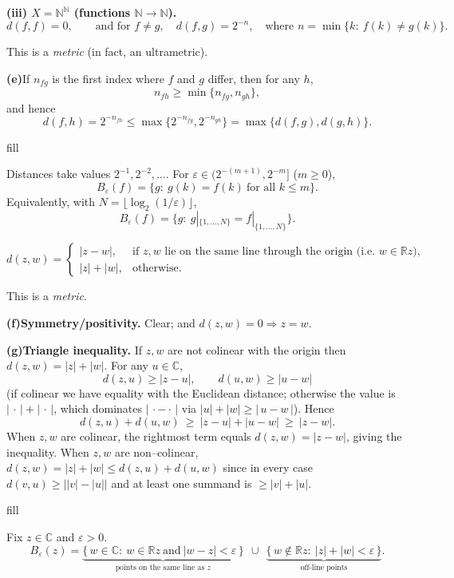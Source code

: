 \begin{problem}[CP-II-0561]
\par\medskip\noindent\textbf{(iii) $X=\mathbb{N}^{\mathbb{N}}$ (functions $\mathbb{N}\to\mathbb{N}$).}\quad
\[
d(f,f)=0,\qquad
\text{and for } f\neq g,\quad d(f,g)=2^{-n},
\quad \text{where } n=\min\{k:\ f(k)\neq g(k)\}.
\]

This is a \emph{metric} (in fact, an ultrametric).

	\par\smallskip\noindent\textbf{(e)}\quad If $n_{fg}$ is the first index where $f$ and $g$ differ, then for any $h$,
	\[
	n_{fh}\ge \min\{n_{fg},n_{gh}\},
	\]
	and hence
	\[
	d(f,h)=2^{-n_{fh}}\le \max\{2^{-n_{fg}},2^{-n_{gh}}\}
	=\max\{d(f,g),d(g,h)\}.
	\]

\noindent
fill

Distances take values $2^{-1},2^{-2},\dots$.
For $\varepsilon\in(2^{-(m+1)},2^{-m}]$ ($m\ge0$),
\[
B_\varepsilon(f)=\{g:\ g(k)=f(k)\ \text{for all } k\le m\}.
\]
Equivalently, with $N=\lfloor\log_2(1/\varepsilon)\rfloor$,
\[
B_\varepsilon(f)=\{g:\ g|_{\{1,\dots,N\}}=f|_{\{1,\dots,N\}}\}.
\]

\[
d(z,w)=
\begin{cases}
	|z-w|, & \text{if $z,w$ lie on the same line through the origin (i.e.\ } w\in \mathbb R z),\\[2mm]
	|z|+|w|, & \text{otherwise.}
\end{cases}
\]

This is a \emph{metric}.

	\par\smallskip\noindent\textbf{(f)}\quad \textbf{Symmetry/positivity.} Clear; and $d(z,w)=0 \Rightarrow z=w$.
	\par\smallskip\noindent\textbf{(g)}\quad \textbf{Triangle inequality.}
	If $z,w$ are not colinear with the origin then $d(z,w)=|z|+|w|$.
	For any $u\in\mathbb C$,
	\[
	d(z,u)\ge |z-u|,\qquad d(u,w)\ge |u-w|
	\]
	(if colinear we have equality with the Euclidean distance; otherwise the value is
	$|\,\cdot\,|+|\,\cdot\,|$, which dominates $|\,\cdot-\cdot\,|$ via
	$|u|+|w|\ge |\,u-w\,|$). Hence
	\[
	d(z,u)+d(u,w)\ \ge\ |z-u|+|u-w|\ \ge\ |z-w|.
	\]
	When $z,w$ are colinear, the rightmost term equals $d(z,w)=|z-w|$, giving the inequality.
	When $z,w$ are non--colinear, $d(z,w)=|z|+|w| \le d(z,u)+d(u,w)$ since in every case
	$d(v,u)\ge \big||v|-|u|\big|$ and at least one summand is $\ge |v|+|u|$.

\noindent
fill

  Fix $z\in\mathbb C$ and $\varepsilon>0$.
\[
B_\varepsilon(z)=
\underbrace{\{\,w\in\mathbb C:\ w\in \mathbb R z\ \text{and}\ |w-z|<\varepsilon\,\}}_{\text{points on the same line as }z}
\ \ \cup\ \
\underbrace{\{\,w\notin \mathbb R z:\ |z|+|w|<\varepsilon\,\}}_{\text{off-line points}}.
\]


\end{problem}
